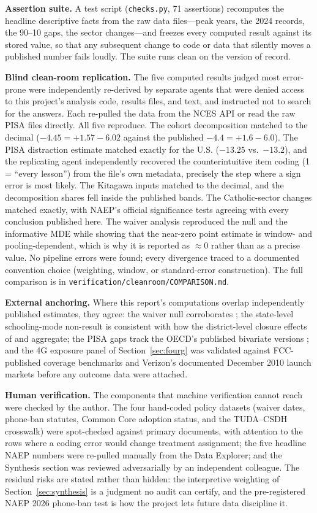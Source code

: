 \documentclass[11pt]{article}
\begin{document}
\textbf{Assertion suite.} A test script (\texttt{checks.py}, 71 assertions) recomputes the headline descriptive facts from the raw data files---peak years, the 2024 records, the 90--10 gaps, the sector changes---and freezes every computed result against its stored value, so that any subsequent change to code or data that silently moves a published number fails loudly. The suite runs clean on the version of record.

\textbf{Blind clean-room replication.} The five computed results judged most error-prone were independently re-derived by separate agents that were denied access to this project's analysis code, results files, and text, and instructed not to search for the answers. Each re-pulled the data from the NCES API or read the raw PISA files directly. All five reproduce. The cohort decomposition matched to the decimal ($-4.45 = +1.57 - 6.02$ against the published $-4.4 = +1.6 - 6.0$). The PISA distraction estimate matched exactly for the U.S. ($-13.25$ vs.\ $-13.2$), and the replicating agent independently recovered the counterintuitive item coding (1 = ``every lesson'') from the file's own metadata, precisely the step where a sign error is most likely. The Kitagawa inputs matched to the decimal, and the decomposition shares fell inside the published bands. The Catholic-sector changes matched exactly, with NAEP's official significance tests agreeing with every conclusion published here. The waiver analysis reproduced the null and the informative MDE while showing that the near-zero point estimate is window- and pooling-dependent, which is why it is reported as $\approx$0 rather than as a precise value. No pipeline errors were found; every divergence traced to a documented convention choice (weighting, window, or standard-error construction). The full comparison is in \texttt{verification/cleanroom/COMPARISON.md}.

\textbf{External anchoring.} Where this report's computations overlap independently published estimates, they agree: the waiver null corroborates \citet{bleiberg2020}; the state-level schooling-mode non-result is consistent with how the district-level closure effects of \citet{goldhaber2023} and \citet{jack2023} aggregate; the PISA gaps track the OECD's published bivariate versions \citep{oecd2024}; and the 4G exposure panel of Section~\ref{sec:fourg} was validated against FCC-published coverage benchmarks and Verizon's documented December 2010 launch markets before any outcome data were attached.

\textbf{Human verification.} The components that machine verification cannot reach were checked by the author. The four hand-coded policy datasets (waiver dates, phone-ban statutes, Common Core adoption status, and the TUDA--CSDH crosswalk) were spot-checked against primary documents, with attention to the rows where a coding error would change treatment assignment; the five headline NAEP numbers were re-pulled manually from the Data Explorer; and the Synthesis section was reviewed adversarially by an independent colleague. The residual risks are stated rather than hidden: the interpretive weighting of Section~\ref{sec:synthesis} is a judgment no audit can certify, and the pre-registered NAEP 2026 phone-ban test is how the project lets future data discipline it.
\end{document}
